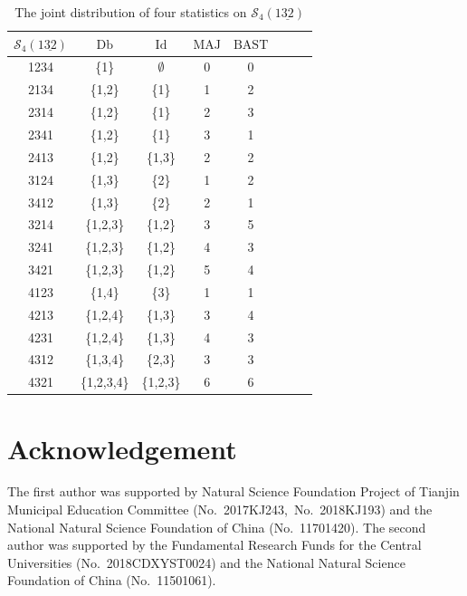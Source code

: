 \documentclass[12pt]{amsart}
\numberwithin{equation}{section}
\theoremstyle{plain}
\theoremstyle{definition}
\def\MAJ{\mathrm{MAJ}}
\def\BAST{\mathrm{BAST}}
\def\Db{\mathrm{Db}}
\def\Id{\mathrm{Id}}
\def\SS{\mathcal{S}}
\begin{document}
\begin{table}[htbp]
\centering \caption{The joint distribution of four statistics on $\SS_4(1\underline{32})$}
\begin{tabular}{|c||c|c|c|c|c|c|c|}
\hline
$\SS_4(1\underline{32})$ & $\Db$ & $\Id$ & $\MAJ$ & $\BAST$\\
\hline
1234 & \{1\} & $\emptyset$ & 0 & 0\\
\hline
2134 & \{1,2\} & \{1\} & 1 & 2\\
\hline
2314 & \{1,2\} & \{1\} & 2 & 3\\
\hline
2341 & \{1,2\} & \{1\} & 3 & 1\\
\hline
2413 & \{1,2\} & \{1,3\} & 2 & 2\\
\hline
3124 & \{1,3\} & \{2\} & 1 & 2\\
\hline
3412 & \{1,3\} & \{2\} & 2 & 1\\
\hline
3214 & \{1,2,3\} & \{1,2\} & 3 & 5\\
\hline
3241 & \{1,2,3\} & \{1,2\} & 4 & 3\\
\hline
3421 & \{1,2,3\} & \{1,2\} & 5 & 4\\
\hline
4123 & \{1,4\} & \{3\} & 1 & 1\\
\hline
4213 & \{1,2,4\} & \{1,3\} & 3 & 4\\
\hline
4231 & \{1,2,4\} & \{1,3\} & 4 & 3\\
\hline
4312 & \{1,3,4\} & \{2,3\} & 3 & 3\\
\hline
4321 & \{1,2,3,4\} & \{1,2,3\} & 6 & 6\\
\hline
\end{tabular}
\label{MAJ-BAST}
\end{table}


\section*{Acknowledgement}
The first author was supported by Natural Science Foundation Project
of Tianjin Municipal Education Committee (No.~2017KJ243,~No.~2018KJ193)
and the National Natural Science Foundation of China (No.~11701420).
The second author was supported by the Fundamental Research Funds for the Central Universities (No.~2018CDXYST0024) and the National Natural Science Foundation of China (No.~11501061).
\end{document}

